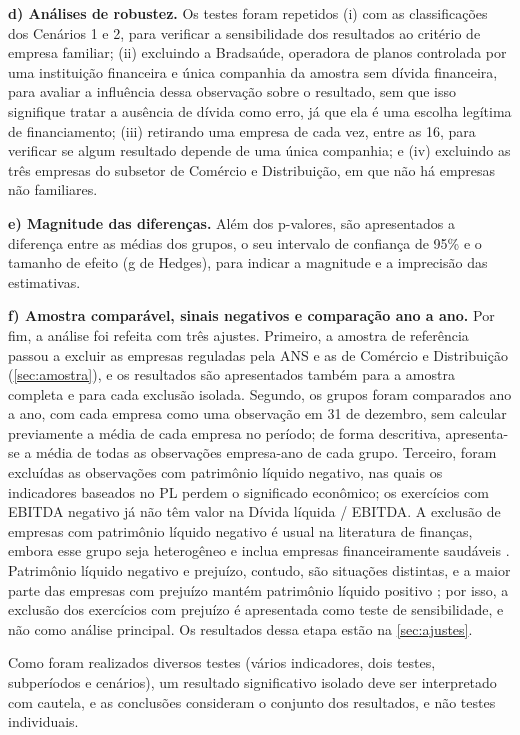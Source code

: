 \textbf{d) Análises de robustez.} Os testes foram repetidos (i) com as
classificações dos Cenários 1 e 2, para verificar a sensibilidade dos resultados ao
critério de empresa familiar; (ii) excluindo a Bradsaúde, operadora de planos
controlada por uma instituição financeira e única companhia da amostra sem dívida
financeira, para avaliar a influência dessa observação sobre o resultado, sem que
isso signifique tratar a ausência de dívida como erro, já que ela é uma escolha
legítima de financiamento; (iii) retirando uma empresa de cada vez, entre as 16,
para verificar se algum resultado depende de uma única companhia; e (iv) excluindo
as três empresas do subsetor de Comércio e Distribuição, em que não há empresas
não familiares.

\textbf{e) Magnitude das diferenças.} Além dos p-valores, são apresentados a
diferença entre as médias dos grupos, o seu intervalo de confiança de 95\% e o
tamanho de efeito (g de Hedges), para indicar a magnitude e a imprecisão das
estimativas.

\textbf{f) Amostra comparável, sinais negativos e comparação ano a ano.} Por fim,
a análise foi refeita com três ajustes. Primeiro, a amostra de referência passou
a excluir as empresas reguladas pela ANS e as de Comércio e Distribuição
(\autoref{sec:amostra}), e os resultados são apresentados também para a amostra
completa e para cada exclusão isolada. Segundo, os grupos foram comparados ano a
ano, com cada empresa como uma observação em 31 de dezembro, sem calcular
previamente a média de cada empresa no período; de forma descritiva, apresenta-se a
média de todas as observações empresa-ano de cada grupo. Terceiro, foram excluídas
as observações com patrimônio líquido negativo, nas quais os indicadores baseados
no PL perdem o significado econômico; os exercícios com EBITDA negativo já não têm
valor na Dívida líquida / EBITDA. A exclusão de empresas com patrimônio líquido
negativo é usual na literatura de finanças, embora esse grupo seja heterogêneo e
inclua empresas financeiramente saudáveis \cite[p.~145]{luo2021}. Patrimônio
líquido negativo e prejuízo, contudo, são situações distintas, e a maior parte das
empresas com prejuízo mantém patrimônio líquido positivo \cite[p.~151]{luo2021};
por isso, a exclusão dos exercícios com prejuízo é apresentada como teste de
sensibilidade, e não como análise principal.
Os resultados dessa etapa estão na \autoref{sec:ajustes}.

Como foram realizados diversos testes (vários indicadores, dois testes,
subperíodos e cenários), um resultado significativo isolado deve ser interpretado
com cautela, e as conclusões consideram o conjunto dos resultados, e não testes
individuais.

